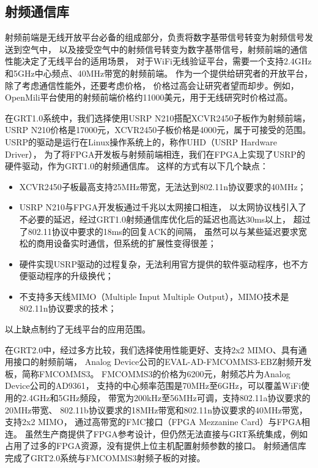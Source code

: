 		\subsection{射频通信库}\label{subsec:grt2.0_rfd}
		射频前端是无线开放平台必备的组成部分，负责将数字基带信号转变为射频信号发送到空气中，
		以及接受空气中的射频信号转变为数字基带信号，射频前端的通信性能决定了无线平台的适用场景，
		对于WiFi无线验证平台，需要一个支持2.4GHz和5GHz中心频点、40MHz带宽的射频前端。
		作为一个提供给研究者的开放平台，除了考虑通信性能外，还要考虑价格，
		价格过高会让研究者望而却步。例如，OpenMili平台使用的射频前端\cite{mobicom16openmili}价格约11000美元，用于无线研究时价格过高。

		在GRT1.0系统中，我们选择使用USRP N210搭配XCVR2450子板\cite{usrpn210}作为射频前端，
		USRP N210价格是17000元，XCVR2450子板价格是4000元，属于可接受的范围。
		USRP的驱动是运行在Linux操作系统上的，称作UHD（USRP Hardware Driver），
		为了将FPGA开发板与射频前端相连，我们在FPGA上实现了USRP的硬件驱动，作为GRT1.0的射频通信库。
		这样的方式有以下几个缺点：
			\begin{itemize}
				\item XCVR2450子板最高支持25MHz带宽，无法达到802.11n协议要求的40MHz；
				\item USRP N210与FPGA开发板通过千兆以太网接口相连，
				以太网协议栈引入了不必要的延迟，经过GRT1.0射频通信库优化后的延迟也高达30ms以上，
				超过了802.11协议中要求的18ms的回复ACK的间隔，
				虽然可以与某些延迟要求宽松的商用设备实时通信，但系统的扩展性变得很差；
				\item 硬件实现USRP驱动的过程复杂，无法利用官方提供的软件驱动程序，也不方便驱动程序的升级换代；
				\item 不支持多天线MIMO（Multiple Input Multiple Output），MIMO技术是802.11n协议要求的技术；
			\end{itemize}

		以上缺点制约了无线平台的应用范围。

		在GRT2.0中，经过多方比较，我们选择使用性能更好、支持2x2 MIMO、具有通用接口的射频前端，
		Analog Device公司的EVAL-AD-FMCOMMS3-EBZ射频开发板\cite{fmcomms3}，简称FMCOMMS3。
		FMCOMMS3的价格为6200元，射频芯片为Analog Device公司的AD9361，
		支持的中心频率范围是70MHz至6GHz，可以覆盖WiFi使用的2.4GHz和5GHz频段，
		带宽为200kHz至56MHz可调，支持802.11a协议要求的20MHz带宽、
		802.11b协议要求的18MHz带宽和802.11n协议要求的40MHz带宽，支持2x2 MIMO，
		通过高带宽的FMC接口（FPGA Mezzanine Card）\cite{wikifmc}与FPGA相连。
		虽然生产商提供了FPGA参考设计，但仍然无法直接与GRT系统集成，例如占用了过多的FPGA资源，没有提供上位主机配置射频参数的接口。
		射频通信库完成了GRT2.0系统与FMCOMMS3射频子板的对接。

